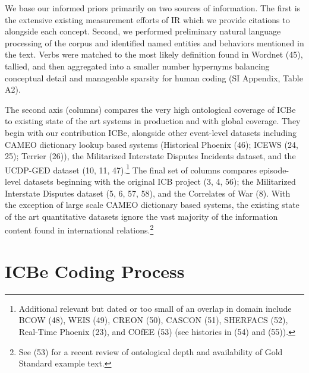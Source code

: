 \documentclass[9pt,twocolumn,twoside,lineno]{pnas-new}
\begin{document}
We base our informed priors primarily on two sources of information. The
first is the extensive existing measurement efforts of IR which we
provide citations to alongside each concept. Second, we performed
preliminary natural language processing of the corpus and identified
named entities and behaviors mentioned in the text. Verbs were matched
to the most likely definition found in Wordnet (45), tallied, and then
aggregated into a smaller number hypernyms balancing conceptual detail
and manageable sparsity for human coding (SI Appendix, Table A2).

The second axis (columns) compares the very high ontological coverage of
ICBe to existing state of the art systems in production and with global
coverage. They begin with our contribution ICBe, alongside other
event-level datasets including CAMEO dictionary lookup based systems
(Historical Phoenix (46); ICEWS (24, 25); Terrier (26)), the Militarized
Interstate Disputes Incidents dataset, and the UCDP-GED dataset (10, 11,
47).\footnote{Additional relevant but dated or too small of an overlap
  in domain include BCOW (48), WEIS (49), CREON (50), CASCON (51),
  SHERFACS (52), Real-Time Phoenix (23), and COfEE (53) (see histories
  in (54) and (55)).} The final set of columns compares episode-level
datasets beginning with the original ICB project (3, 4, 56); the
Militarized Interstate Disputes dataset (5, 6, 57, 58), and the
Correlates of War (8). With the exception of large scale CAMEO
dictionary based systems, the existing state of the art quantitative
datasets ignore the vast majority of the information content found in
international relations.\footnote{See (53) for a recent review of
  ontological depth and availability of Gold Standard example text.}

\hypertarget{icbe-coding-process}{%
\section*{ICBe Coding Process}\label{icbe-coding-process}}
\end{document}
